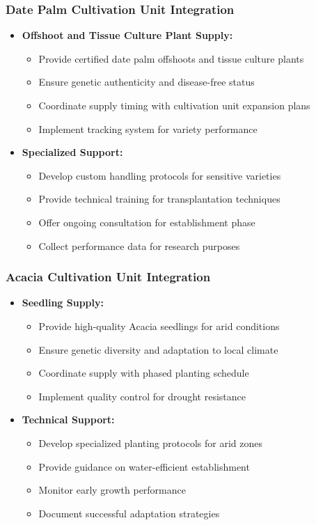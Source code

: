 \subsubsection{Date Palm Cultivation Unit Integration} \label{sec:nursery_palm_integration}
\begin{itemize}
    \item \textbf{Offshoot and Tissue Culture Plant Supply:}
    \begin{itemize}
        \item Provide certified date palm offshoots and tissue culture plants
        \item Ensure genetic authenticity and disease-free status
        \item Coordinate supply timing with cultivation unit expansion plans
        \item Implement tracking system for variety performance
    \end{itemize}
    
    \item \textbf{Specialized Support:}
    \begin{itemize}
        \item Develop custom handling protocols for sensitive varieties
        \item Provide technical training for transplantation techniques
        \item Offer ongoing consultation for establishment phase
        \item Collect performance data for research purposes
    \end{itemize}
\end{itemize}

\subsubsection{Acacia Cultivation Unit Integration}
\begin{itemize}
    \item \textbf{Seedling Supply:}
    \begin{itemize}
        \item Provide high-quality Acacia seedlings for arid conditions
        \item Ensure genetic diversity and adaptation to local climate
        \item Coordinate supply with phased planting schedule
        \item Implement quality control for drought resistance
    \end{itemize}
    
    \item \textbf{Technical Support:}
    \begin{itemize}
        \item Develop specialized planting protocols for arid zones
        \item Provide guidance on water-efficient establishment
        \item Monitor early growth performance
        \item Document successful adaptation strategies
    \end{itemize}
\end{itemize}

